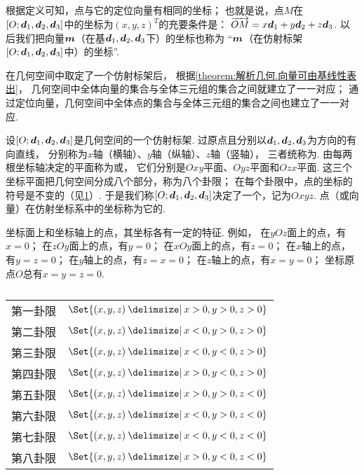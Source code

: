 根据定义可知，点与它的定位向量有相同的坐标；
也就是说，点\(M\)在\([O;\boldsymbol{d}_1,\boldsymbol{d}_2,\boldsymbol{d}_3]\)中的坐标为\((x,y,z)^T\)的充要条件是：
\(\overrightarrow{OM} = x \boldsymbol{d}_1 + y \boldsymbol{d}_2 + z \boldsymbol{d}_3\).
以后我们把向量\(\boldsymbol{m}\)（在基\(\boldsymbol{d}_1,\boldsymbol{d}_2,\boldsymbol{d}_3\)下）的坐标也称为
“\(\boldsymbol{m}\)（在仿射标架\([O;\boldsymbol{d}_1,\boldsymbol{d}_2,\boldsymbol{d}_3]\)中）的坐标”.

在几何空间中取定了一个仿射标架后，
根据\cref{theorem:解析几何.向量可由基线性表出}，
几何空间中全体向量的集合与全体三元组的集合之间就建立了一一对应；
通过定位向量，几何空间中全体点的集合与全体三元组的集合之间也建立了一一对应.

设\([O;\boldsymbol{d}_1,\boldsymbol{d}_2,\boldsymbol{d}_3]\)是几何空间的一个仿射标架.
过原点且分别以\(\boldsymbol{d}_1,\boldsymbol{d}_2,\boldsymbol{d}_3\)为方向的有向直线，
分别称为\(x\)轴（横轴）、\(y\)轴（纵轴）、\(z\)轴（竖轴），
三者统称为.
由每两根坐标轴决定的平面称为或，
它们分别是\(Oxy\)平面、\(Oyz\)平面和\(Ozx\)平面.
这三个坐标平面把几何空间分成八个部分，称为八个卦限；
在每个卦限中，点的坐标的符号是不变的（见\cref{table:解析几何.几何空间的八个卦限}）.
于是我们称\([O;\boldsymbol{d}_1,\boldsymbol{d}_2,\boldsymbol{d}_3]\)决定了一个，记为\(Oxyz\).
点（或向量）在仿射坐标系中的坐标称为它的.

坐标面上和坐标轴上的点，其坐标各有一定的特征.
例如，%
在\(yOz\)面上的点，有\(x=0\)；
在\(zOy\)面上的点，有\(y=0\)；
在\(xOy\)面上的点，有\(z=0\)；
在\(x\)轴上的点，有\(y=z=0\)；
在\(y\)轴上的点，有\(z=x=0\)；
在\(z\)轴上的点，有\(x=y=0\)；
坐标原点\(O\)总有\(x=y=z=0\).

\begin{table}
\centering
\def\guaxian#1#2#3{\Set{ (x,y,z) \given x #1 0, y #2 0, z #3 0 }}%
\def\arraystretch{1.2}%
\begin{tabular}{cl}%
第一卦限 & \(\guaxian{>}{>}{>}\) \\
第二卦限 & \(\guaxian{<}{>}{>}\) \\
第三卦限 & \(\guaxian{<}{<}{>}\) \\
第四卦限 & \(\guaxian{>}{<}{>}\) \\
第五卦限 & \(\guaxian{>}{>}{<}\) \\
第六卦限 & \(\guaxian{<}{>}{<}\) \\
第七卦限 & \(\guaxian{<}{<}{<}\) \\
第八卦限 & \(\guaxian{>}{<}{<}\) \\
\end{tabular}%
\caption{}
\label{table:解析几何.几何空间的八个卦限}
\end{table}

